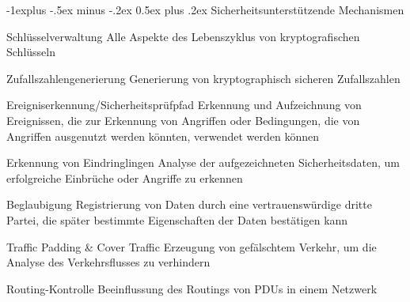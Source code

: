 \documentclass[a4paper]{article}
\makeatletter
\renewcommand{\subsection}{\@startsection{subsection}{2}{0mm}%
 {-1explus -.5ex minus -.2ex}%
 {0.5ex plus .2ex}%
 {\normalfont\normalsize\bfseries}}
\makeatother
\begin{document}
\begin{multicols}{3}
      \subsection{Sicherheitsunterstützende Mechanismen}
      \begin{description*}
            \item[Schlüsselverwaltung] Alle Aspekte des Lebenszyklus von kryptografischen Schlüsseln
            \item[Zufallszahlengenerierung] Generierung von kryptographisch sicheren Zufallszahlen
            \item[Ereigniserkennung/Sicherheitsprüfpfad] Erkennung und Aufzeichnung von Ereignissen, die zur Erkennung von Angriffen oder Bedingungen, die von Angriffen ausgenutzt werden könnten, verwendet werden können
            \item[Erkennung von Eindringlingen] Analyse der aufgezeichneten Sicherheitsdaten, um erfolgreiche Einbrüche oder Angriffe zu erkennen
            \item[Beglaubigung] Registrierung von Daten durch eine vertrauenswürdige dritte Partei, die später bestimmte Eigenschaften der Daten bestätigen kann
            \item[Traffic Padding \& Cover Traffic] Erzeugung von gefälschtem Verkehr, um die Analyse des Verkehrsflusses zu verhindern
            \item[Routing-Kontrolle] Beeinflussung des Routings von PDUs in einem Netzwerk
      \end{description*}



\end{multicols}
\end{document}
